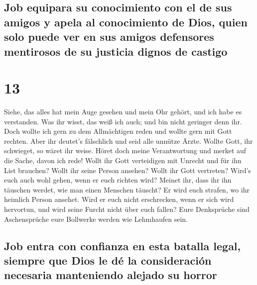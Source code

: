\hypertarget{job-equipara-su-conocimiento-con-el-de-sus-amigos-y-apela-al-conocimiento-de-dios-quien-solo-puede-ver-en-sus-amigos-defensores-mentirosos-de-su-justicia-dignos-de-castigo}{%
\subsection{Job equipara su conocimiento con el de sus amigos y apela al
conocimiento de Dios, quien solo puede ver en sus amigos defensores
mentirosos de su justicia dignos de
castigo}\label{job-equipara-su-conocimiento-con-el-de-sus-amigos-y-apela-al-conocimiento-de-dios-quien-solo-puede-ver-en-sus-amigos-defensores-mentirosos-de-su-justicia-dignos-de-castigo}}

\hypertarget{section-12}{%
\section{13}\label{section-12}}

 Siehe, das alles hat mein Auge gesehen und mein Ohr
gehört, und ich habe es verstanden.  Was ihr wisst, das
weiß ich auch; und bin nicht geringer denn ihr.  Doch
wollte ich gern zu dem Allmächtigen reden und wollte gern mit Gott
rechten.  Aber ihr deutet's fälschlich und seid alle
unnütze Ärzte.  Wollte Gott, ihr schwieget, so wäret ihr
weise.  Höret doch meine Verantwortung und merket auf die
Sache, davon ich rede!  Wollt ihr Gott verteidigen mit
Unrecht und für ihn List brauchen?  Wollt ihr seine Person
ansehen? Wollt ihr Gott vertreten?  Wird's euch auch wohl
gehen, wenn er euch richten wird? Meinet ihr, dass ihr ihn täuschen
werdet, wie man einen Menschen täuscht?  Er wird euch
strafen, wo ihr heimlich Person ansehet.  Wird er euch
nicht erschrecken, wenn er sich wird hervortun, und wird seine Furcht
nicht über euch fallen?  Eure Denksprüche sind
Aschensprüche eure Bollwerke werden wie Lehmhaufen sein.

\hypertarget{job-entra-con-confianza-en-esta-batalla-legal-siempre-que-dios-le-duxe9-la-consideraciuxf3n-necesaria-manteniendo-alejado-su-horror}{%
\subsection{Job entra con confianza en esta batalla legal, siempre que
Dios le dé la consideración necesaria manteniendo alejado su
horror}\label{job-entra-con-confianza-en-esta-batalla-legal-siempre-que-dios-le-duxe9-la-consideraciuxf3n-necesaria-manteniendo-alejado-su-horror}}

